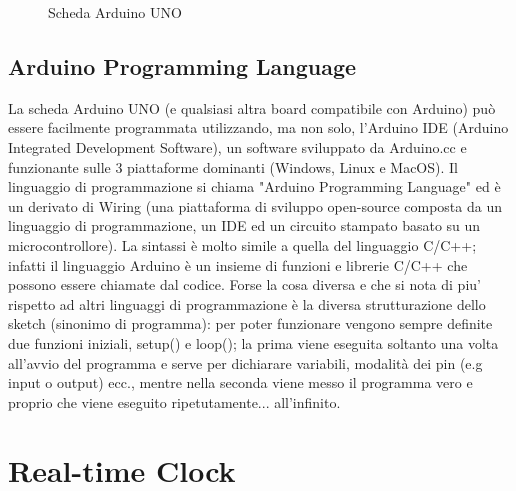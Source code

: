 \documentclass[12pt]{report}
\begin{document}
\begin{figure}
	\caption{Scheda Arduino UNO}
	\label{fig:uno}
\end{figure}

%
\subsection{Arduino Programming Language}
%

La scheda Arduino UNO (e qualsiasi altra board compatibile con Arduino) può essere facilmente programmata utilizzando, ma non solo, l'Arduino IDE (Arduino Integrated Development Software), un software sviluppato da Arduino.cc e funzionante sulle 3 piattaforme dominanti (Windows, Linux e MacOS). Il linguaggio di programmazione si chiama "Arduino Programming Language"\cite{sistemi_embedded_atrent} ed è un derivato di Wiring (una piattaforma di sviluppo open-source composta da un linguaggio di programmazione, un IDE ed un circuito stampato basato su un microcontrollore). La sintassi è molto simile a quella del linguaggio C/C++; infatti il linguaggio Arduino è un insieme di funzioni e librerie C/C++ che possono essere chiamate dal codice. Forse la cosa diversa e che si nota di piu' rispetto ad altri linguaggi di programmazione è la diversa strutturazione dello sketch (sinonimo di programma): per poter funzionare vengono sempre definite due funzioni iniziali, setup() e loop(); la prima viene eseguita soltanto una volta all'avvio del programma e serve per dichiarare variabili, modalità dei pin (e.g input o output) ecc., mentre nella seconda viene messo il programma vero e proprio che viene eseguito ripetutamente... all'infinito.


%
\section{Real-time Clock}
%
\end{document}
